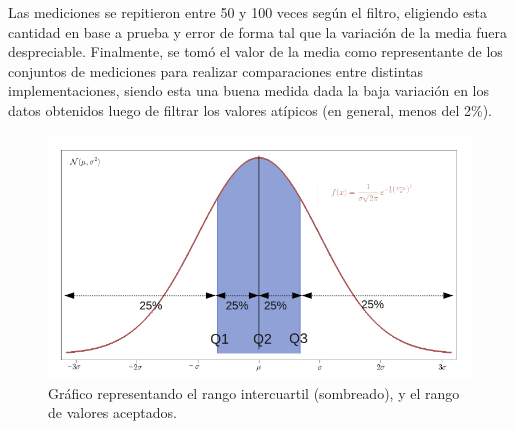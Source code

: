 Las mediciones se repitieron entre 50 y 100 veces según el filtro, eligiendo esta cantidad en base a prueba y error de forma tal que la variación de la media fuera despreciable. Finalmente, se tomó el valor de la media como representante de los conjuntos de mediciones para realizar comparaciones entre distintas implementaciones, siendo esta una buena medida dada la baja variación en los datos obtenidos luego de filtrar los valores atípicos (en general, menos del 2\%).
\begin{figure}[h!]
\begin{center}
  \includegraphics[scale=0.5]{secciones/consideraciones/imagenes/cuartiles.png}
\end{center}
\caption{Gráfico representando el rango intercuartil (sombreado), y el rango de valores aceptados.}
\label{fig:cuariles}
\end{figure}
	

	

